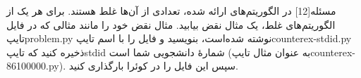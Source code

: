 ‌مسئله[12]
در الگوریتم‌های ارائه شده، تعدادی از آن‌ها غلط هستند. برای هر یک از الگوریتم‌‌های غلط، یک مثال نقض بیابید. مثال نقض خود را مانند مثالی که در فایل 
‌تایپ{problem.py} 
نوشته شده‌است، بنویسید و فایل را با اسم
‌تایپ{counterex-stdid.py}
ذخیره کنید که ‌تایپ{stdid} شمارۀ دانشجویی شما است (به عنوان مثال 
‌تایپ{counterex-86100000.py}). سپس این فایل را در کوئرا بارگذاری کنید. 












